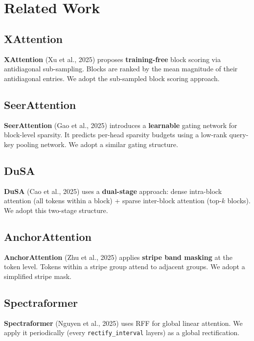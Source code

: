 \section{Related Work}

\subsection{XAttention}

\textbf{XAttention} (Xu et al., 2025) proposes \textbf{training-free} block scoring via 
antidiagonal sub-sampling. Blocks are ranked by the mean magnitude of their 
antidiagonal entries. We adopt the sub-sampled block scoring approach.

\subsection{SeerAttention}

\textbf{SeerAttention} (Gao et al., 2025) introduces a \textbf{learnable} gating network 
for block-level sparsity. It predicts per-head sparsity budgets using a 
low-rank query-key pooling network. We adopt a similar gating structure.

\subsection{DuSA}

\textbf{DuSA} (Cao et al., 2025) uses a \textbf{dual-stage} approach: dense intra-block 
attention (all tokens within a block) + sparse inter-block attention (top-$k$ 
blocks). We adopt this two-stage structure.

\subsection{AnchorAttention}

\textbf{AnchorAttention} (Zhu et al., 2025) applies \textbf{stripe band masking} at the 
token level. Tokens within a stripe group attend to adjacent groups. We adopt 
a simplified stripe mask.

\subsection{Spectraformer}

\textbf{Spectraformer} (Nguyen et al., 2025) uses RFF for global linear attention. 
We apply it periodically (every \texttt{rectify\_interval} layers) as a global 
rectification.


